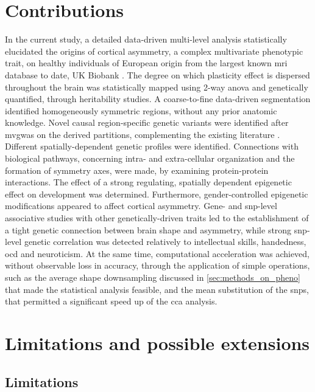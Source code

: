 \section{Contributions}
In the current study, a detailed  data-driven multi-level analysis statistically elucidated the origins of cortical asymmetry, a complex multivariate phenotypic trait, on healthy individuals of European origin from the largest known \ac{mri} database to date, UK Biobank \cite{Littlejohns2020}. The degree on which plasticity effect is dispersed throughout the brain was statistically mapped using 2-way \ac{anova} and genetically quantified, through heritability studies. A coarse-to-fine data-driven segmentation identified homogeneously symmetric regions, without any prior anatomic knowledge.  Novel causal region-specific genetic variants were identified after \ac{mvgwas} on the derived partitions, complementing the existing literature \cite{Sha2021}. Different spatially-dependent genetic profiles were identified. Connections with biological pathways, concerning intra- and extra-cellular organization and the formation of symmetry axes, were made, by examining protein-protein interactions. The effect of a strong regulating, spatially dependent epigenetic effect on development was determined. Furthermore, gender-controlled epigenetic modifications appeared to affect cortical asymmetry. Gene- and \ac{snp}-level associative studies  with other genetically-driven traits led to the establishment of a tight genetic connection between  brain shape and asymmetry, while strong \ac{snp}-level genetic correlation was detected relatively to intellectual skills, handedness, \ac{ocd} and neuroticism. At the same time, computational acceleration was achieved, without observable loss in accuracy, through the application of simple operations, such as the average shape downsampling discussed in \autoref{sec:methods_on_pheno} that made the statistical analysis feasible, and the mean substitution of the \acp{snp}, that permitted a significant speed up of the \ac{cca} analysis.

\section{Limitations and possible extensions}
\subsection{Limitations}

